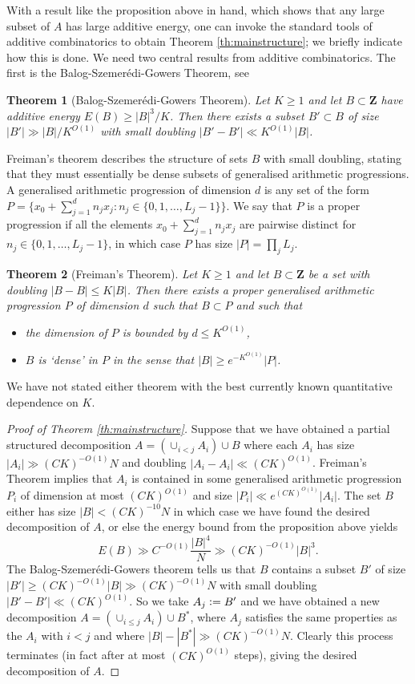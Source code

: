 \documentclass[11pt, reqno]{amsart}
\newtheorem{theorem}{Theorem}[section]
\begin{document}
With a result like the proposition above in hand, which shows that any large subset of $A$ has large additive energy, one can invoke the standard tools of additive combinatorics to obtain Theorem \ref{th:mainstructure}; we briefly indicate how this is done. We need two central results from additive combinatorics. The first is the Balog-Szemer\'edi-Gowers Theorem, see \cite[Theorem 2.27]{taovubook}
\begin{theorem}[Balog-Szemer\'edi-Gowers Theorem]\label{th:balog}
    Let $K\geqslant 1$ and let $B\subset\mathbf{Z}$ have additive energy $E(B)\geqslant |B|^3/K$. Then there exists a subset $B'\subset B$ of size $|B'|\gg |B|/K^{O(1)}$ with small doubling $|B'-B'|\ll K^{O(1)}|B|$.
\end{theorem}
Freiman's theorem \cite[Theorem 5.44]{taovubook} describes the structure of sets $B$ with small doubling, stating that they must essentially be dense subsets of generalised arithmetic progressions. A generalised arithmetic progression of dimension $d$ is any set of the form $P=\{x_0+\sum_{j=1}^d n_jx_j:n_j\in\{0,1,\dots,L_j-1\}\}$. We say that $P$ is a proper progression if all the elements $x_0+\sum_{j=1}^d n_jx_j$ are pairwise distinct for $n_j\in\{0,1,\dots,L_j-1\}$, in which case $P$ has size $|P|= \prod_j L_j$. 
\begin{theorem}[Freiman's Theorem]\label{th:freiman}
    Let $K\geqslant 1$ and let $B\subset\mathbf{Z}$ be a set with doubling $|B-B|\leqslant K|B|$. Then there exists a proper generalised arithmetic progression $P$ of dimension $d$ such that $B\subset P$ and such that
    \begin{itemize}
        \item the dimension of $P$ is bounded by $d\leqslant K^{O(1)}$,
        \item $B$ is `dense' in $P$ in the sense that $|B|\geqslant e^{-K^{O(1)}}|P|$.
    \end{itemize}
\end{theorem}
We have not stated either theorem with the best currently known quantitative dependence on $K$.
\begin{proof}[Proof of Theorem \ref{th:mainstructure}]
Suppose that we have obtained a partial structured decomposition $A=(\cup_{i<j}A_i)\cup B$ where each $A_i$ has size $|A_i|\gg (CK)^{-O(1)}N$ and doubling $|A_i-A_i|\ll (CK)^{O(1)}$. Freiman's Theorem implies that $A_i$ is contained in some generalised arithmetic progression $P_i$ of dimension at most $(CK)^{O(1)}$ and size $|P_i|\ll e^{(CK)^{O(1)}}|A_i|$. The set $B$ either has size $|B|<(CK)^{-10}N$ in which case we have found the desired decomposition of $A$, or else the energy bound from the proposition above yields
$$E(B)\gg C^{-O(1)}\frac{|B|^4}{N}\gg (CK)^{-O(1)}|B|^3.$$ The Balog-Szemer\'edi-Gowers theorem tells us that $B$ contains a subset $B'$ of size $|B'|\geqslant (CK)^{-O(1)}|B|\gg (CK)^{-O(1)}N$ with small doubling $|B'-B'|\ll (CK)^{O(1)}$. So we take $A_j\vcentcolon= B'$ and we have obtained a new decomposition $A=(\cup_{i\leqslant j}A_i)\cup B^*$, where $A_j$ satisfies the same properties as the $A_i$ with $i<j$ and where $|B|-|B^*|\gg (CK)^{-O(1)}N$. Clearly this process terminates (in fact after at most $(CK)^{O(1)}$ steps), giving the desired decomposition of $A$.
\end{proof}
\appendix
\end{document}
